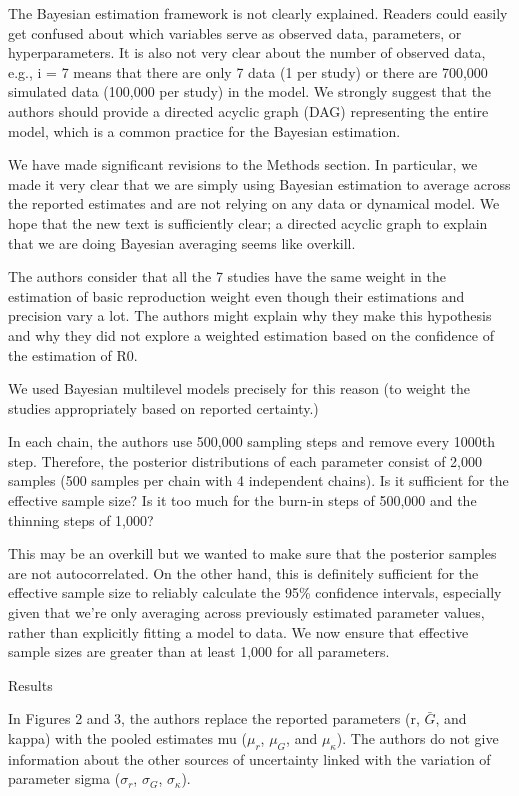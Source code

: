 \documentclass[12pt]{article}
\newcommand{\revtext}{\textsf}
\begin{document}
\revtext{The Bayesian estimation framework is not clearly explained. Readers could easily get confused
about which variables serve as observed data, parameters, or hyperparameters. It is also not
very clear about the number of observed data, e.g., i = 7 means that there are only 7 data (1 per
study) or there are 700,000 simulated data (100,000 per study) in the model. We strongly
suggest that the authors should provide a directed acyclic graph (DAG) representing the entire
model, which is a common practice for the Bayesian estimation.}

We have made significant revisions to the Methods section. 
In particular, we made it very clear that we are simply using Bayesian estimation to average across the reported estimates and are not relying on any data or dynamical model.
We hope that the new text is sufficiently clear; a directed acyclic graph to explain that we are doing Bayesian averaging seems like overkill.

\revtext{The authors consider that all the 7 studies have the same weight in the estimation of basic
reproduction weight even though their estimations and precision vary a lot. The authors might
explain why they make this hypothesis and why they did not explore a weighted estimation
based on the confidence of the estimation of R0.}

We used Bayesian multilevel models precisely for this reason (to weight the studies appropriately based on reported certainty.)

\revtext{In each chain, the authors use 500,000 sampling steps and remove every 1000th step.
Therefore, the posterior distributions of each parameter consist of 2,000 samples (500 samples
per chain with 4 independent chains). Is it sufficient for the effective sample size? Is it too much
for the burn-in steps of 500,000 and the thinning steps of 1,000?}

This may be an overkill but we wanted to make sure that the posterior samples are not autocorrelated.
On the other hand, this is definitely sufficient for the effective sample size to reliably calculate the 95\% confidence intervals, especially given that we're only averaging across previously estimated parameter values, rather than explicitly fitting a model to data. We now ensure that effective sample sizes are greater than at least 1,000 for all parameters.

\revtext{Results}

\revtext{In Figures 2 and 3, the authors replace the reported parameters (r, $\bar G$, and kappa) with the
pooled estimates mu ($\mu_r$, $\mu_G$, and $\mu_\kappa$). The authors do not give information about
the other sources of uncertainty linked with the variation of parameter sigma ($\sigma_r$, $\sigma_G$,
$\sigma_\kappa$).}
\end{document}
